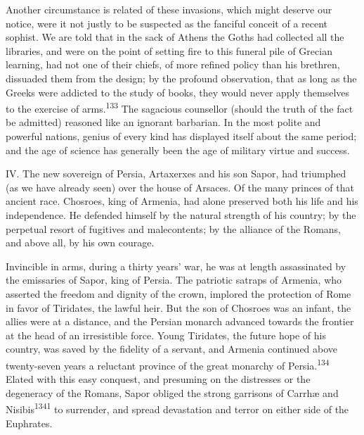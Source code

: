 
Another circumstance is related of these invasions, which might
deserve our notice, were it not justly to be suspected as the
fanciful conceit of a recent sophist. We are told that in the
sack of Athens the Goths had collected all the libraries, and
were on the point of setting fire to this funeral pile of Grecian
learning, had not one of their chiefs, of more refined policy
than his brethren, dissuaded them from the design; by the
profound observation, that as long as the Greeks were addicted to
the study of books, they would never apply themselves to the
exercise of arms.\textsuperscript{133} The sagacious counsellor (should the truth
of the fact be admitted) reasoned like an ignorant barbarian. In
the most polite and powerful nations, genius of every kind has
displayed itself about the same period; and the age of science
has generally been the age of military virtue and success.


IV. The new sovereign of Persia, Artaxerxes and his son Sapor,
had triumphed (as we have already seen) over the house of
Arsaces. Of the many princes of that ancient race. Chosroes, king
of Armenia, had alone preserved both his life and his
independence. He defended himself by the natural strength of his
country; by the perpetual resort of fugitives and malecontents;
by the alliance of the Romans, and above all, by his own courage.

Invincible in arms, during a thirty years’ war, he was at length
assassinated by the emissaries of Sapor, king of Persia. The
patriotic satraps of Armenia, who asserted the freedom and
dignity of the crown, implored the protection of Rome in favor of
Tiridates, the lawful heir. But the son of Chosroes was an
infant, the allies were at a distance, and the Persian monarch
advanced towards the frontier at the head of an irresistible
force. Young Tiridates, the future hope of his country, was saved
by the fidelity of a servant, and Armenia continued above
twenty-seven years a reluctant province of the great monarchy of
Persia.\textsuperscript{134} Elated with this easy conquest, and presuming on the
distresses or the degeneracy of the Romans, Sapor obliged the
strong garrisons of Carrhæ and Nisibis\textsuperscript{1341} to surrender, and
spread devastation and terror on either side of the Euphrates.

